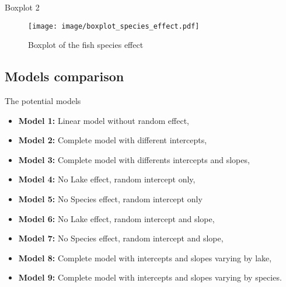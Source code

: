 \documentclass[unknownkeysallowed]{beamer}
\begin{document}
\begin{frame}{Boxplot 2}

\begin{figure}
    \centering
    \texttt{[image: image/boxplot\_species\_effect.pdf]}
    \caption{Boxplot of the fish species effect}
    \label{fig:my_label}
\end{figure}


\end{frame}

\subsection{Models comparison}
\label{sub:model comparison}

\begin{frame}{The potential models}

\begin{itemize}
    \item \textbf{Model 1:} Linear model without random effect,
    \item \textbf{Model 2:} Complete model with different intercepts, 
    \item \textbf{Model 3:} Complete model with differents intercepts and slopes,
    \item \textbf{Model 4:} No Lake effect, random intercept only,
    \item \textbf{Model 5:} No Species effect, random intercept only
    \item \textbf{Model 6:} No Lake effect, random intercept and slope,
    \item \textbf{Model 7:} No Species effect, random intercept and slope,
    \item \textbf{Model 8:} Complete model with intercepts and slopes varying by lake, 
    \item \textbf{Model 9:} Complete model with intercepts and slopes varying by species.
\end{itemize}

\end{frame}
\end{document}
